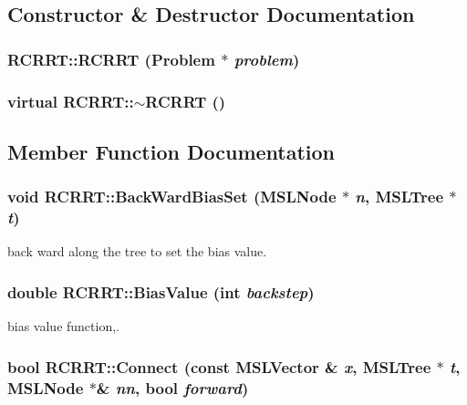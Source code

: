 \subsection{Constructor \& Destructor Documentation}
\subsubsection{\setlength{\rightskip}{0pt plus 5cm}RCRRT::RCRRT ({\bf Problem} $\ast$ {\em problem})}\label{classRCRRT_a4}


\subsubsection{\setlength{\rightskip}{0pt plus 5cm}virtual RCRRT::$\sim$RCRRT ()\hspace{0.3cm}{\tt  [inline, virtual]}}\label{classRCRRT_a5}




\subsection{Member Function Documentation}
\subsubsection{\setlength{\rightskip}{0pt plus 5cm}void RCRRT::Back\-Ward\-Bias\-Set ({\bf MSLNode} $\ast$ {\em n}, {\bf MSLTree} $\ast$ {\em t})\hspace{0.3cm}{\tt  [virtual]}}\label{classRCRRT_a2}


back ward along the tree to set the bias value.

\subsubsection{\setlength{\rightskip}{0pt plus 5cm}double RCRRT::Bias\-Value (int {\em backstep})}\label{classRCRRT_a3}


bias value function,.

\subsubsection{\setlength{\rightskip}{0pt plus 5cm}bool RCRRT::Connect (const {\bf MSLVector} \& {\em x}, {\bf MSLTree} $\ast$ {\em t}, {\bf MSLNode} $\ast$\& {\em nn}, bool {\em forward})\hspace{0.3cm}{\tt  [virtual]}}\label{classRCRRT_a9}


